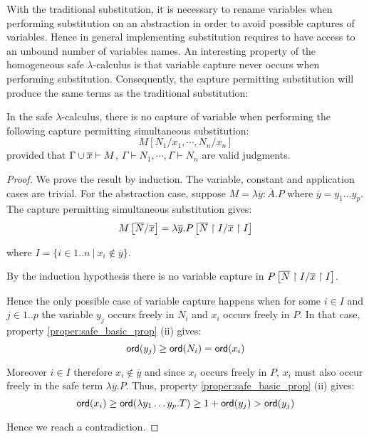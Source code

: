 With the traditional substitution, it is necessary to rename variables when performing substitution on an abstraction
in order to avoid possible captures of variables. Hence in general implementing substitution requires to have
access to an unbound number
of variables names.
An interesting property of the homogeneous safe $\lambda$-calculus is that
variable capture never occurs when performing substitution.
Consequently, the capture permitting substitution will produce the same terms as the traditional substitution:

\begin{lem}
\label{lem:homog_nocapture}
In the safe $\lambda$-calculus, there is no capture of variable
when performing the following capture permitting simultaneous substitution:
$$ M[N_1 / x_1 , \cdots, N_n / x_n] $$
provided that $\Gamma \cup \overline{x} \vdash M$, $\Gamma \vdash  N_1, \cdots ,\Gamma \vdash  N_n$ are valid judgments.
\end{lem}

\begin{proof}
We prove the result by induction. The variable, constant and application cases are trivial.
For the abstraction case, suppose $M = \lambda \overline{y} : \overline{A}. P$ where $\overline{y} = y_1 \ldots y_p$. The capture permitting
simultaneous substitution gives:
$$M \left[ \overline{N}/\overline{x} \right] = \lambda \overline{y} . P
\left[ \overline{N} \upharpoonright I/\overline{x} \upharpoonright I \right]$$

where $I  = \{ i \in 1..n \ | \ x_i \not \in \overline{y} \}$.


By the induction hypothesis there is no variable capture in $P
\left[ \overline{N} \upharpoonright I/\overline{x} \upharpoonright I \right]$.

Hence the only possible case of variable capture happens when for some $i \in I$ and $j \in 1..p$ the variable $y_j$ occurs freely
in $N_i$ and $x_i$ occurs freely in $P$. In that case, property \ref{proper:safe_basic_prop} (ii) gives:
$$ {\sf ord}(y_j) \geq {\sf ord}(N_i) = {\sf ord}(x_i)$$

Moreover $i\in I$ therefore $x_i \not \in \overline{y}$ and since $x_i$ occurs freely in $P$, $x_i$ must also occur freely in the safe term
$\lambda \overline{y}. P$. Thus, property \ref{proper:safe_basic_prop} (ii) gives:
$$ {\sf ord}(x_i) \geq {\sf ord}(\lambda y_1 \ldots y_p . T) \geq 1+ {\sf ord}(y_j) > {\sf ord}(y_j)$$

Hence we reach a contradiction.
\end{proof}




